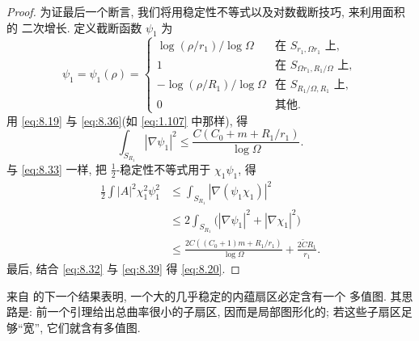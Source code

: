 \begin{proof}
为证最后一个断言, 我们将用稳定性不等式以及对数截断技巧, 来利用面积的
二次增长. 定义截断函数 $\psi_1$ 为
\begin{equation}
\psi_1=\psi_1(\rho)=
\begin{cases}
\log(\rho/r_1)/\log\Omega&\text{在 }S_{r_1,\Omega r_1}\text{ 上},\\
1&\text{在 }S_{\Omega r_1,R_1/\Omega}\text{ 上},\\
-\log(\rho/R_1)/\log\Omega&\text{在 }S_{R_1/\Omega,R_1}\text{ 上},\\
0&\text{其他}.
\end{cases}
\label{eq:8.37}
\end{equation}
用 \eqref{eq:8.19} 与 \eqref{eq:8.36}(如 \eqref{eq:1.107} 中那样), 得
\begin{equation}
\int_{S_{R_1}}|\nabla\psi_1|^2
\leq\frac{C(C_0+m+R_1/r_1)}{\log\Omega}.
\label{eq:8.38}
\end{equation}
与 \eqref{eq:8.33} 一样, 把 $\frac12$-稳定性不等式用于 $\chi_1\psi_1$, 得
\begin{equation}
\begin{aligned}
\frac12\int|A|^2\chi_1^2\psi_1^2
&\leq\int_{S_{R_1}}|\nabla(\psi_1\chi_1)|^2\\
&\leq2\int_{S_{R_1}}\bigl(|\nabla\psi_1|^2+|\nabla\chi_1|^2\bigr)\\
&\leq\frac{2C((C_0+1)m+R_1/r_1)}{\log\Omega}
+\frac{2\tilde C R_1}{r_1}.
\label{eq:8.39}
\end{aligned}
\end{equation}
最后, 结合 \eqref{eq:8.32} 与 \eqref{eq:8.39} 得 \eqref{eq:8.20}.
\end{proof}


来自 \cite{CM3} 的下一个结果表明, 一个大的几乎稳定的内蕴扇区必定含有一个
多值图. 其思路是: 前一个引理给出总曲率很小的子扇区, 因而是局部图形化的;
若这些子扇区足够``宽'', 它们就含有多值图.

